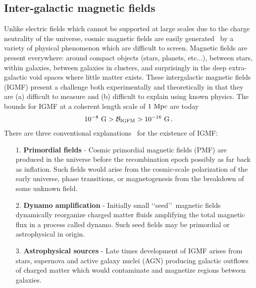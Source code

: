 \documentclass[a4paper]{article}
\begin{document}
\subsection{Inter-galactic magnetic fields}\label{sec:IGMF}
\noindent Unlike electric fields which cannot be supported at large scales due to the charge neutrality of the universe, cosmic magnetic fields are easily generated~\cite{kronberg1994extragalactic,gaensler2004origin,durrer2013cosmological} by a variety of physical phenomenon which are difficult to screen. Magnetic fields are present everywhere: around compact objects (stars, planets, etc...), between stars, within galaxies, between galaxies in clusters, and surprisingly in the deep extra-galactic void spaces where little matter exists. These intergalactic magnetic fields (IGMF) present a challenge both experimentally and theoretically in that they are (a) difficult to measure and (b) difficult to explain using known physics. The bounds for IGMF at a coherent length scale of $1{\rm\ Mpc}$ are today~\cite{neronov2010evidence,taylor2011extragalactic,vernstrom2021discovery}
\begin{align}
    10^{-8}{\rm\ G}>\mathcal{B}_{\rm IGFM}>10^{-16}{\rm\ G}\,.
\end{align}
There are three conventional explanations~\cite{batista2021gammaray} for the existence of IGMF:
\begin{itemize}
    \item [1.] \textbf{Primordial fields} - Cosmic primordial magnetic fields (PMF) are produced in the universe before the recombination epoch possibly as far back as inflation. Such fields would arise from the cosmic-scale polarization of the early universe, phase transitions, or magnetogenesis from the breakdown of some unknown field.
    \item [2.] \textbf{Dynamo amplification} - Initially small \lq\lq seed\rq\rq\ magnetic fields dynamically reorganize charged matter fluids amplifying the total magnetic flux in a process called dynamo. Such seed fields may be primordial or astrophysical in origin.
    \item [3.] \textbf{Astrophysical sources} - Late times development of IGMF arises from stars, supernova and active galaxy nuclei (AGN) producing galactic outflows of charged matter which would contaminate and magnetize regions between galaxies.
\end{itemize}
\end{document}
